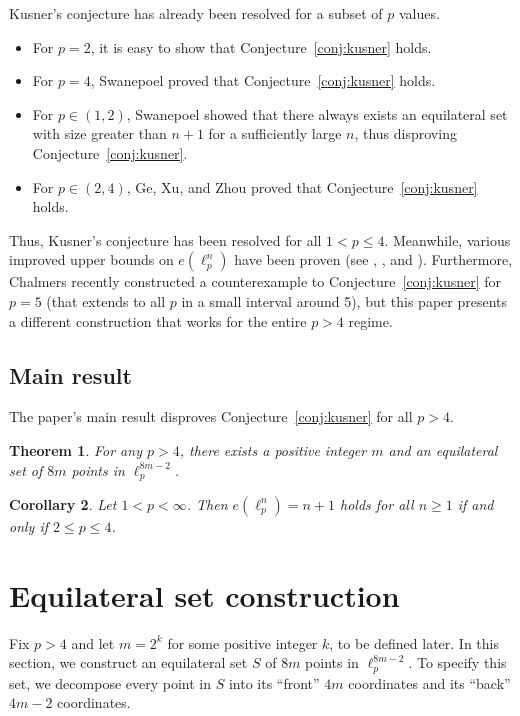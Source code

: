 \documentclass[11pt,reqno]{amsart}
\theoremstyle{plain}
\newtheorem{theorem}{Theorem}[section]
\newtheorem{corollary}[theorem]{Corollary}
\theoremstyle{definition}
\theoremstyle{remark}
\numberwithin{equation}{section}
\begin{document}
Kusner's conjecture has already been resolved for a subset of $p$ values.
\begin{itemize}
    \item For $p=2$, it is easy to show that Conjecture~\ref{conj:kusner} holds.
    \item For $p=4$, Swanepoel \cite{Swanepoel2} proved that Conjecture~\ref{conj:kusner} holds.
    \item For $p\in(1,2)$, Swanepoel \cite{Swanepoel2} showed that there always exists an equilateral set with size greater than $n+1$ for a sufficiently large $n$, thus disproving Conjecture~\ref{conj:kusner}.
    \item For $p\in(2,4)$, Ge, Xu, and Zhou \cite{ge2026} proved that Conjecture~\ref{conj:kusner} holds.
\end{itemize}
Thus, Kusner's conjecture has been resolved for all $1<p\le 4$. Meanwhile, various improved upper bounds on $e(\ell_p^n)$ have been proven (see \cite{Konyagin2011}, \cite{CHEN2022103459}, and \cite{ge2026}). Furthermore, Chalmers \cite{chalmers2026} recently constructed a counterexample to Conjecture~\ref{conj:kusner} for $p=5$ (that extends to all $p$ in a small interval around 5), but this paper presents a different construction that works for the entire $p>4$ regime.

\subsection{Main result}
The paper's main result disproves Conjecture~\ref{conj:kusner} for all $p>4$. 
\begin{theorem}\label{thm:main}
For any $p>4$, there exists a positive integer $m$ and an equilateral set of $8m$ points in  $\ell_p^{8m-2}$.
\end{theorem}
\begin{corollary}\label{cor:kusner}
Let $1<p<\infty$. Then $e(\ell_p^n)=n+1$ holds for all $n\ge 1$ if and only if $2\le p\le 4$.
\end{corollary}

\section{Equilateral set construction}\label{sec:construction}
Fix $p>4$ and let $m=2^k$ for some positive integer $k$, to be defined later. In this section, we construct an equilateral set $S$ of $8m$ points in $\ell_p^{8m-2}$. To specify this set, we decompose every point in $S$ into its ``front'' $4m$ coordinates and its ``back'' $4m-2$ coordinates.
\end{document}
